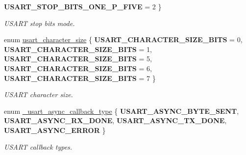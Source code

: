 \begin{DoxyCompactItemize}
{\bfseries U\+S\+A\+R\+T\+\_\+\+S\+T\+O\+P\+\_\+\+B\+I\+T\+S\+\_\+\+O\+N\+E\+\_\+\+P\+\_\+\+F\+I\+VE} = 2
 \}\begin{DoxyCompactList}\small\item\em U\+S\+A\+RT stop bits mode. \end{DoxyCompactList}
\item 
\mbox{\label{group___h_p_l_ga631ce7b4f60dccd392e6d6ef7d3cd4e2}} 
enum \hyperlink{group___h_p_l_ga631ce7b4f60dccd392e6d6ef7d3cd4e2}{usart\+\_\+character\+\_\+size} \{ \newline
{\bfseries U\+S\+A\+R\+T\+\_\+\+C\+H\+A\+R\+A\+C\+T\+E\+R\+\_\+\+S\+I\+Z\+E\+\_\+B\+I\+TS} = 0, 
{\bfseries U\+S\+A\+R\+T\+\_\+\+C\+H\+A\+R\+A\+C\+T\+E\+R\+\_\+\+S\+I\+Z\+E\+\_\+B\+I\+TS} = 1, 
{\bfseries U\+S\+A\+R\+T\+\_\+\+C\+H\+A\+R\+A\+C\+T\+E\+R\+\_\+\+S\+I\+Z\+E\+\_\+B\+I\+TS} = 5, 
{\bfseries U\+S\+A\+R\+T\+\_\+\+C\+H\+A\+R\+A\+C\+T\+E\+R\+\_\+\+S\+I\+Z\+E\+\_\+B\+I\+TS} = 6, 
\newline
{\bfseries U\+S\+A\+R\+T\+\_\+\+C\+H\+A\+R\+A\+C\+T\+E\+R\+\_\+\+S\+I\+Z\+E\+\_\+B\+I\+TS} = 7
 \}\begin{DoxyCompactList}\small\item\em U\+S\+A\+RT character size. \end{DoxyCompactList}
\item 
\mbox{\label{group___h_p_l_gace00dc77ac02c91f8bf35551b484927c}} 
enum \hyperlink{group___h_p_l_gace00dc77ac02c91f8bf35551b484927c}{\+\_\+usart\+\_\+async\+\_\+callback\+\_\+type} \{ {\bfseries U\+S\+A\+R\+T\+\_\+\+A\+S\+Y\+N\+C\+\_\+\+B\+Y\+T\+E\+\_\+\+S\+E\+NT}, 
{\bfseries U\+S\+A\+R\+T\+\_\+\+A\+S\+Y\+N\+C\+\_\+\+R\+X\+\_\+\+D\+O\+NE}, 
{\bfseries U\+S\+A\+R\+T\+\_\+\+A\+S\+Y\+N\+C\+\_\+\+T\+X\+\_\+\+D\+O\+NE}, 
{\bfseries U\+S\+A\+R\+T\+\_\+\+A\+S\+Y\+N\+C\+\_\+\+E\+R\+R\+OR}
 \}\begin{DoxyCompactList}\small\item\em U\+S\+A\+RT callback types. \end{DoxyCompactList}
\end{DoxyCompactItemize}
